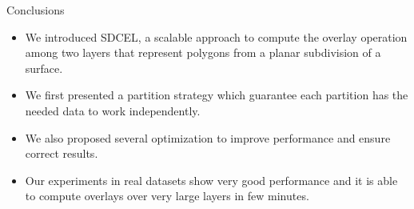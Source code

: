 \documentclass{beamer}
\begin{document}
    \begin{frame}{Conclusions}
        \begin{itemize}
            \item We introduced SDCEL, a scalable approach to compute the overlay operation among two layers that represent polygons from a planar subdivision of a surface.
            \item We first presented a partition strategy which guarantee each partition has the needed data to work independently.
            \item We also proposed several optimization to improve performance and ensure correct results.
            \item Our experiments in real datasets show very good performance and it is able to compute overlays over very large layers in few minutes.
        \end{itemize}
    \end{frame}    
\end{document}
